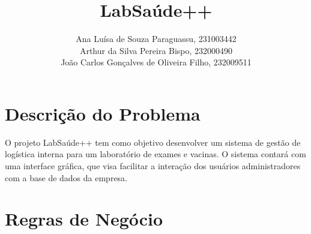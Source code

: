 \documentclass{article}
\title{\fontsize{20}{20}\selectfont LabSaúde++\\}
\author{Ana Luísa de Souza Paraguassu, 231003442\\
        Arthur da Silva Pereira Bispo,  232000490\\
        João Carlos Gonçalves de Oliveira Filho, 232009511\\
}
\date{}
\begin{document}
\maketitle
\fontsize{12}{15}\selectfont %
\sectionfont{\fontsize{14}{18}\selectfont} %
\titlespacing{\section}{0pt}{30pt}{10pt} %


\vspace{mm}

\section{Descrição do Problema}
O projeto LabSaúde++ tem como objetivo desenvolver um sistema de gestão de logística interna para um laboratório de exames e vacinas. O sistema contará com uma interface gráfica, que visa facilitar a interação dos usuários administradores com a base de dados da empresa.



\section{Regras de Negócio}
\end{document}
